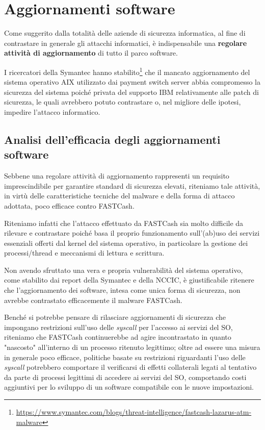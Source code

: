 \documentclass[10pt,a4paper, titlepage]{report}
\begin{document}
\section{Aggiornamenti software}

Come suggerito dalla totalità delle aziende di sicurezza informatica, al fine di contrastare in generale gli attacchi informatici, è indispensabile una \textbf{regolare attività di aggiornamento} di tutto il parco software.

I ricercatori della Symantec hanno stabilito\footnote{\url{https://www.symantec.com/blogs/threat-intelligence/fastcash-lazarus-atm-malware}} che il mancato aggiornamento del sistema operativo AIX utilizzato dai payment switch server abbia compromesso la sicurezza del sistema poiché privata del supporto IBM relativamente alle patch di sicurezza, le quali avrebbero potuto contrastare o, nel migliore delle ipotesi, impedire l'attacco informatico. 

\subsection{Analisi dell'efficacia degli aggiornamenti software}

Sebbene una regolare attività di aggiornamento rappresenti un requisito imprescindibile per garantire standard di sicurezza elevati, riteniamo tale attività, in virtù delle caratteristiche tecniche del malware e della forma di attacco adottata, poco efficace contro FASTCash.
 
Riteniamo infatti che l'attacco effettuato da FASTCash sia molto difficile da rilevare e contrastare poiché basa il proprio funzionamento sull'(ab)uso dei servizi essenziali offerti dal kernel del sistema operativo, in particolare la gestione dei processi/thread e meccanismi di lettura e scrittura. 

Non avendo sfruttato una vera e propria vulnerabilità del sistema operativo, come stabilito dai report della Symantec e della NCCIC, è giustificabile ritenere che l'aggiornamento dei software, intesa come unica forma di sicurezza, non avrebbe contrastato efficacemente il malware FASTCash. 

Benché si potrebbe pensare di rilasciare aggiornamenti di sicurezza che impongano restrizioni sull'uso delle \textit{syscall} per l'accesso ai servizi del SO, riteniamo che FASTCash continuerebbe ad agire incontrastato in quanto "nascosto" all'interno di un processo ritenuto legittimo; oltre ad essere una misura in generale poco efficace, politiche basate su restrizioni riguardanti l'uso delle \textit{syscall} potrebbero comportare il verificarsi di effetti collaterali legati al tentativo da parte di processi legittimi di accedere ai servizi del SO, comportando costi aggiuntivi per lo sviluppo di un software compatibile con le nuove impostazioni. 
\end{document}
